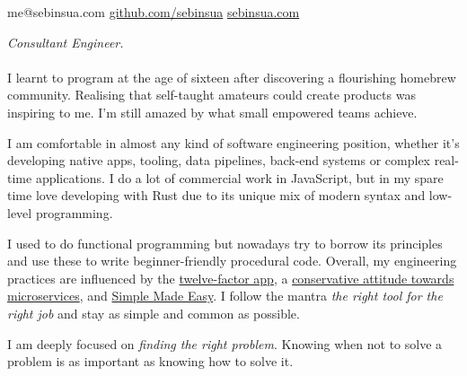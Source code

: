 \documentclass[10pt,a4paper]{article}
\begin{document}
\sloppy  %


\nobreakvspace{0.3em}  %

\noindent
me@sebinsua.com\sbull
\href{http://github.com/sebinsua}{github.com/sebinsua}\sbull
\href{http://sebinsua.com}{sebinsua.com}

\spacedhrule{0.9em}{-0.4em}  %


\vspace{-1.3em}  %
\begin{multicols}{2}  %
\noindent \emph{Consultant Engineer.}
\\
\\
\noindent I learnt to program at the age of sixteen after discovering a flourishing homebrew community. Realising that self-taught amateurs could create products was inspiring to me. I'm still amazed by what small empowered teams achieve.\newline

\noindent I am comfortable in almost any kind of software engineering position, whether it's developing native apps, tooling, data pipelines, back-end systems or complex real-time applications. I do a lot of commercial work in JavaScript, but in my spare time love developing with Rust due to its unique mix of modern syntax and low-level programming.\newline

\noindent I used to do functional programming but nowadays try to borrow its principles and use these to write beginner-friendly procedural code. Overall, my engineering practices are influenced by the \href{http://12factor.net}{twelve-factor app}, a \href{https://www.tigerteam.dk/2014/micro-services-its-not-only-the-size-that-matters-its-also-how-you-use-them-part-2/}{conservative attitude towards microservices}, and \href{http://infoq.com/presentations/Simple-Made-Easy}{Simple Made Easy}. I follow the mantra \emph{the right tool for the right job} and stay as simple and common as possible.\newline

\noindent I am deeply focused on \emph{finding the right problem}. Knowing when not to solve a problem is as important as knowing how to solve it.

\end{multicols}
\end{document}
